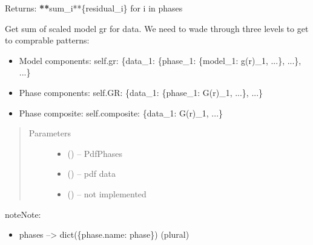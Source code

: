 \documentclass[letterpaper,10pt,english]{sphinxmanual}
\begin{document}
\begin{fulllineitems}
\begin{fulllineitems}
\begin{description}
\end{description}

Returns: {\color{red}\bfseries{}**}sum\_i**\{residual\_i\} for i in phases

\end{fulllineitems}


\begin{fulllineitems}
\label{\detokenize{rst/pairdistributionfunction:mstack.pairdistributionfunction.PdfRefinement.phase_composite}}
Get sum of scaled model gr for data. We need to wade through three levels
to get to comprable patterns:
\begin{itemize}
\item {} 
Model components: self.gr: \{data\_1: \{phase\_1: \{model\_1: g(r)\_1, ...\}, ...\}, ...\}

\item {} 
Phase components: self.GR: \{data\_1: \{phase\_1: G(r)\_1, ...\}, ...\}

\item {} 
Phase composite: self.composite: \{data\_1: G(r)\_1, ...\}

\end{itemize}
\begin{quote}\begin{description}
\item[{Parameters}] \leavevmode\begin{itemize}
\item {} 
 () -- PdfPhases

\item {} 
 ({\hyperref[\detokenize{rst/pairdistributionfunction:mstack.pairdistributionfunction.PdfData}]{}}) -- pdf data

\item {} 
 () -- not implemented

\end{itemize}

\end{description}\end{quote}

\begin{sphinxadmonition}{note}{Note:}\begin{itemize}
\item {} 
phases --\textgreater{} dict(\{phase.name: phase\}) (plural)


\end{itemize}
\end{sphinxadmonition}
\end{fulllineitems}
\end{fulllineitems}
\end{document}
